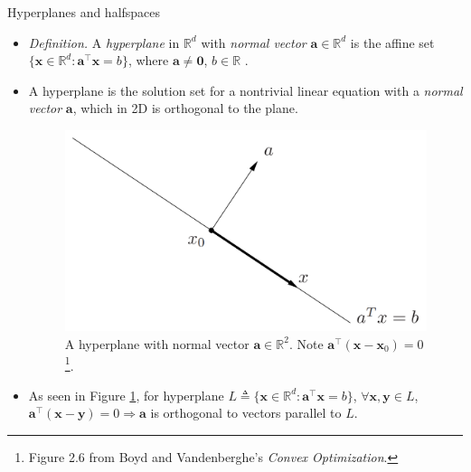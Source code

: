 \documentclass{beamer}
\numberwithin{equation}{section}
\newcommand{\aref}[1]{\alert{\ref{#1}}}
\begin{document}
\begin{frame}{Hyperplanes and halfspaces}
    \begin{itemize}
        \item
        \textit{Definition.} A \textit{hyperplane} in $ \mathbb{R}^d $ with
        \textit{normal vector} $ \mathbf{a} \in \mathbb{R}^d $ is the affine
        set
        $ \{\mathbf{x} \in \mathbb{R}^d : \mathbf{a}^\top\mathbf{x} = b \} $,
        where $ \mathbf{a} \ne \mathbf{0} $, $ b \in \mathbb{R} $
        \cite{bv_convex_opt}.

        \item
        A hyperplane is the solution set for a nontrivial linear equation with
        a \textit{normal vector} $ \mathbf{a} $, which in 2D is orthogonal
        to the plane.

        \begin{figure}
            \centering
            \includegraphics[scale=0.2]{hyperplane.png}
            \vspace{-5 pt}
            \caption{
                A hyperplane with normal vector $ \mathbf{a} \in
                \mathbb{R}^2 $. Note $ \mathbf{a}^\top(\mathbf{x} -
                \mathbf{x}_0) = 0 $\footnote{
                    Figure 2.6 from Boyd and Vandenberghe's
                    \textit{Convex Optimization}.                
                }.
            }
            \label{fig:hyperplane}
            \vspace{-5 pt}
        \end{figure}

        \item
        As seen in Figure \aref{fig:hyperplane}, for hyperplane
        $ L \triangleq \{\mathbf{x} \in \mathbb{R}^d :
        \mathbf{a}^\top\mathbf{x} = b \} $,
        $ \forall \mathbf{x}, \mathbf{y} \in L $,
        $ \mathbf{a}^\top(\mathbf{x} - \mathbf{y}) = 0 \Rightarrow \mathbf{a} $
        is orthogonal to vectors parallel to $ L $.
    \end{itemize}

    \medskip
\end{frame}
\end{document}
